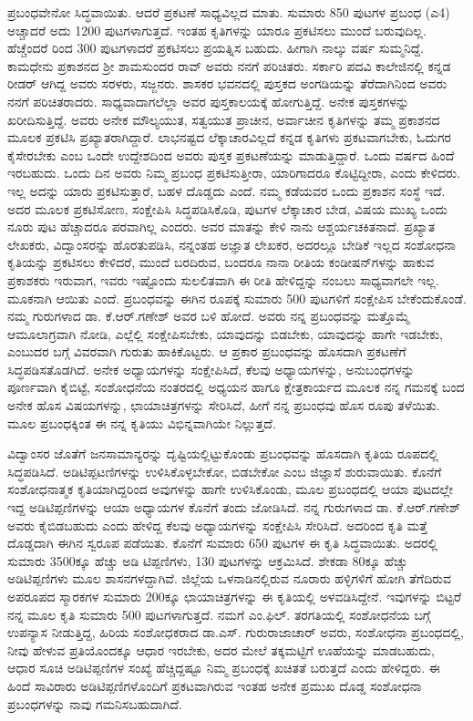 ಪ್ರಬಂಧವೇನೋ ಸಿದ್ಧವಾಯಿತು. ಆದರೆ ಪ್ರಕಟಣೆ ಸಾಧ್ಯವಿಲ್ಲದ ಮಾತು. ಸುಮಾರು 850 ಪುಟಗಳ ಪ್ರಬಂಧ (ಎ4) ಅಚ್ಚಾದರೆ ಅದು 1200 ಪುಟಗಳಾಗುತ್ತದೆ. ಇಂತಹ ಕೃತಿಗಳನ್ನು ಯಾರೂ ಪ್ರಕಟಿಸಲು ಮುಂದೆ ಬರುವುದಿಲ್ಲ. ಹೆಚ್ಚೆಂದರೆ ರಿಂದ 300 ಪುಟಗಳಾದರೆ ಪ್ರಕಟಿಸಲು ಪ್ರಯತ್ನಿಸ ಬಹುದು. ಹೀಗಾಗಿ ನಾಲ್ಕು ವರ್ಷ ಸುಮ್ಮನಿದ್ದೆ. ಕಾಮಧೇನು ಪ್ರಕಾಶನದ ಶ‍್ರೀ ಶಾಮಸುಂದರ ರಾವ್​ ಅವರು ನನಗೆ ಪರಿಚಿತರು. ಸರ್ಕಾರಿ ಪದವಿ ಕಾಲೇಜಿನಲ್ಲಿ ಕನ್ನಡ ರೀಡರ್​ ಆಗಿದ್ದ ಅವರು ಸರಳರು, ಸಜ್ಜನರು. ಶಾಸಕರ ಭವನದಲ್ಲಿ ಪುಸ್ತಕದ ಅಂಗಡಿಯನ್ನು ತೆರೆದಾಗಿನಿಂದ ಅವರು ನನಗೆ ಪರಿಚಿತರಾದರು. ಸಾಧ್ಯ\-ವಾದಾಗಲೆಲ್ಲಾ ಅವರ ಪುಸ್ತಕಾಲಯಕ್ಕೆ ಹೋಗುತ್ತಿದ್ದೆ. ಅನೇಕ ಪುಸ್ತಕಗಳನ್ನು ಖರೀದಿಸುತ್ತಿದ್ದೆ. ಅವರು ಅನೇಕ ಮೌಲ್ಯಯುತ, ಸತ್ವಯುತ ಪ್ರಾಚೀನ, ಅರ್ವಾಚೀನ ಕೃತಿಗಳನ್ನು ತಮ್ಮ ಪ್ರಕಾಶನದ ಮೂಲಕ ಪ್ರಕಟಿಸಿ ಪ್ರಖ್ಯಾತರಾಗಿದ್ದಾರೆ. ಲಾಭ\-ನಷ್ಟದ ಲೆಕ್ಕಾಚಾರವಿಲ್ಲದೆ ಕನ್ನಡ ಕೃತಿಗಳು ಪ್ರಕಟವಾಗಬೇಕು, ಓದುಗರ ಕೈಸೇರಬೇಕು ಎಂಬ ಒಂದೇ ಉದ್ದೇಶದಿಂದ ಅವರು ಪುಸ್ತಕ ಪ್ರಕಟಣೆಯನ್ನು ಮಾಡುತ್ತಿದ್ದಾರೆ. ಒಂದು ವರ್ಷದ ಹಿಂದೆ ಇರಬಹುದು. ಒಂದು ದಿನ ಅವರು ನಿಮ್ಮ ಪ್ರಬಂಧ ಪ್ರಕಟಿಸು\-ತ್ತೀರಾ, ಯಾರಿಗಾದರೂ ಕೊಟ್ಟಿದ್ದೀರಾ, ಎಂದು ಕೇಳಿದರು. ಇಲ್ಲ ಅದನ್ನು ಯಾರು ಪ್ರಕಟಿಸುತ್ತಾರೆ, ಬಹಳ ದೊಡ್ಡದು ಎಂದೆ. ನಮ್ಮ ಕಡೆಯವರ ಒಂದು ಪ್ರಕಾಶನ ಸಂಸ್ಥೆ ಇದೆ. ಅದರ ಮೂಲಕ ಪ್ರಕಟಿಸೋಣ, ಸಂಕ್ಷೇಪಿಸಿ ಸಿದ್ಧಪಡಿಸಿಕೊಡಿ, ಪುಟಗಳ ಲೆಕ್ಕಾಚಾರ ಬೇಡ, ವಿಷಯ ಮುಖ್ಯ ಒಂದು ನೂರು ಪುಟ ಹೆಚ್ಚಾದರೂ ಪರವಾಗಿಲ್ಲ ಎಂದರು. ಅವರ ಮಾತನ್ನು ಕೇಳಿ ನಾನು ಆಶ್ಚರ್ಯಚಕಿತನಾದೆ. ಪ್ರಖ್ಯಾತ ಲೇಖಕರು, ವಿದ್ವಾಂಸರನ್ನು ಹೊರತುಪಡಿಸಿ, ನನ್ನಂತಹ ಅಜ್ಞಾತ ಲೇಖಕರ, ಅದರಲ್ಲೂ ಬೇಡಿಕೆ ಇಲ್ಲದ ಸಂಶೋಧನಾ ಕೃತಿಯನ್ನು ಪ್ರಕಟಿಸಲು ಕೇಳಿದರೆ, ಮುಂದೆ ಬರದಿರುವ, ಬಂದರೂ ನಾನಾ ರೀತಿಯ ಕಂಡೀಷನ್​ಗಳನ್ನು ಹಾಕುವ ಪ್ರಕಾಶಕರು ಇರುವಾಗ, ಇವರು ಇಷ್ಟೊಂದು ಸುಲಲಿತವಾಗಿ ಈ ರೀತಿ ಹೇಳಿದ್ದನ್ನು ನಂಬಲು ಸಾಧ್ಯವಾಗಲೇ ಇಲ್ಲ. ಮೂಕನಾಗಿ ಆಯಿತು ಎಂದೆ. ಪ್ರಬಂಧವನ್ನು ಈಗಿನ ರೂಪಕ್ಕೆ ಸುಮಾರು 500 ಪುಟಗಳಿಗೆ ಸಂಕ್ಷೇಪಿಸ ಬೇಕೆಂದುಕೊಂಡೆ. ನಮ್ಮ ಗುರುಗಳಾದ ಡಾ. ಕೆ.ಆರ್​.ಗಣೇಶ್​ ಅವರ ಬಳಿ ಹೋದೆ. ಅವರು ನನ್ನ ಪ್ರಬಂಧವನ್ನು ಮತ್ತೊಮ್ಮೆ ಆಮೂಲಾಗ್ರವಾಗಿ ನೋಡಿ, ಎಲ್ಲೆಲ್ಲಿ ಸಂಕ್ಷೇಪಿಸಬೇಕು, ಯಾವುದನ್ನು ಬಿಡಬೇಕು, ಯಾವುದನ್ನು ಹಾಗೇ ಇಡಬೇಕು, ಎಂಬುದರ ಬಗ್ಗೆ ವಿವರವಾಗಿ ಗುರುತು ಹಾಕಿಕೊಟ್ಟರು. ಆ ಪ್ರಕಾರ ಪ್ರಬಂಧವನ್ನು ಹೊಸದಾಗಿ ಪ್ರಕಟಣೆಗೆ ಸಿದ್ಧಪಡಿಸತೊಡಗಿದೆ. ಅನೇಕ ಅಧ್ಯಾಯಗಳನ್ನು ಸಂಕ್ಷೇಪಿಸಿದೆ, ಕೆಲವು ಅಧ್ಯಾಯಗಳನ್ನು, ಅನುಬಂಧಗಳನ್ನು ಪೂರ್ಣವಾಗಿ ಕೈಬಿಟ್ಟೆ, ಸಂಶೋಧನೆಯ ನಂತರದಲ್ಲಿ ಅಧ್ಯಯನ ಹಾಗೂ ಕ್ಷೇತ್ರಕಾರ್ಯದ ಮೂಲಕ ನನ್ನ ಗಮನಕ್ಕೆ ಬಂದ ಅನೇಕ ಹೊಸ ವಿಷಯಗಳನ್ನು, ಛಾಯಾಚಿತ್ರಗಳನ್ನು ಸೇರಿಸಿದೆ, ಹೀಗೆ ನನ್ನ ಪ್ರಬಂಧವು ಹೊಸ ರೂಪು ತಳೆಯಿತು. ಮೂಲ ಪ್ರಬಂಧಕ್ಕಿಂತ ಈ ನನ್ನ ಕೃತಿಯು ವಿಭಿನ್ನವಾಗಿಯೇ ನಿಲ್ಲುತ್ತದೆ.

ವಿದ್ವಾಂಸರ ಜೊತೆಗೆ ಜನಸಾಮಾನ್ಯರನ್ನು ದೃಷ್ಟಿಯಲ್ಲಿಟ್ಟುಕೊಂಡು ಪ್ರಬಂಧವನ್ನು ಹೊಸದಾಗಿ ಕೃತಿಯ ರೂಪದಲ್ಲಿ ಸಿದ್ಧಪಡಿಸಿದೆ. ಅಡಿಟಿಪ್ಪಟಣಿಗಳನ್ನು ಉಳಿಸಿಕೊಳ್ಳಬೇಕೋ, ಬಿಡಬೇಕೋ ಎಂಬ ಜಿಜ್ಞಾಸೆ ಶುರುವಾಯಿತು. ಕೊನೆಗೆ ಸಂಶೋಧನಾತ್ಮಕ ಕೃತಿಯಾಗಿದ್ದರಿಂದ ಅವುಗಳನ್ನು ಹಾಗೇ ಉಳಿಸಿಕೊಂಡು, ಮೂಲ ಪ್ರಬಂಧದಲ್ಲಿ ಆಯಾ ಪುಟದಲ್ಲೇ ಇದ್ದ ಅಡಿಟಿಪ್ಪಣಿಗಳನ್ನು ಆಯಾ ಅಧ್ಯಾಯಗಳ ಕೊನೆಗೆ ತಂದು ಜೋಡಿಸಿದೆ. ನನ್ನ ಗುರುಗಳಾದ ಡಾ. ಕೆ.ಆರ್​.ಗಣೇಶ್​ ಅವರು ಕೈಬಿಡಬಹುದು ಎಂದು ಹೇಳಿದ್ದ ಕೆಲವು ಅಧ್ಯಾಯಗಳನ್ನು ಸಂಕ್ಷೇಪಿಸಿ ಸೇರಿಸಿದೆ. ಅದರಿಂದ ಕೃತಿ ಮತ್ತೆ ದೊಡ್ಡದಾಗಿ ಈಗಿನ ಸ್ವರೂಪ ಪಡೆಯಿತು. ಕೊನೆಗೆ ಸುಮಾರು 650 ಪುಟಗಳ ಈ ಕೃತಿ ಸಿದ್ಧವಾಯಿತು. ಅದರಲ್ಲಿ ಸುಮಾರು 3500ಕ್ಕೂ ಹೆಚ್ಚು ಅಡಿ ಟಿಪ್ಪಣಿಗಳು, 130 ಪುಟಗಳನ್ನು ಆಕ್ರಮಿಸಿದೆ. ಶೇಕಡಾ 80ಕ್ಕೂ ಹೆಚ್ಚು ಅಡಿಟಿಪ್ಪಣಿಗಳು ಮೂಲ ಶಾಸನಗಳದ್ದಾಗಿವೆ. ಜಿಲ್ಲೆಯ ಒಳನಾಡಿನಲ್ಲಿರುವ ನೂರಾರು ಹಳ್ಳಿಗಳಿಗೆ ಹೋಗಿ ತೆಗೆದಿರುವ ಅಪರೂಪದ ಸ್ಮಾರಕಗಳ ಸುಮಾರು 200ಕ್ಕೂ ಛಾಯಾಚಿತ್ರಗಳನ್ನು ಈ ಕೃತಿಯಲ್ಲಿ ಅಳವಡಿಸಿದ್ದೇನೆ. ಇವುಗಳನ್ನು ಬಿಟ್ಟರೆ ನನ್ನ ಮೂಲ ಕೃತಿ ಸುಮಾರು 500 ಪುಟಗಳಾಗುತ್ತದೆ. ನಮಗೆ ಎಂ.ಫಿಲ್​. ತರಗತಿಯಲ್ಲಿ ಸಂಶೋಧನೆಯ ಬಗ್ಗೆ ಉಪನ್ಯಾಸ ನೀಡುತ್ತಿದ್ದ, ಹಿರಿಯ ಸಂಶೋಧಕರಾದ ಡಾ.ಎಸ್​. ಗುರುರಾಜಾಚಾರ್​ ಅವರು, ಸಂಶೋಧನಾ ಪ್ರಬಂಧದಲ್ಲಿ, ನೀವು ಹೇಳುವ ಪ್ರತಿಯೊಂದಕ್ಕೂ ಆಧಾರ ಇರಬೇಕು, ಅದರ ಮೇಲೆ ತಕ್ಕಮಟ್ಟಿಗೆ ಊಹೆಯನ್ನು ಮಾಡಬಹುದು, ಆಧಾರ ಸೂಚಿ ಅಡಿಟಿಪ್ಪಣಿಗಳ ಸಂಖ್ಯೆ ಹೆಚ್ಚಿದ್ದಷ್ಟೂ ನಿಮ್ಮ ಪ್ರಬಂಧಕ್ಕೆ ಖಚಿತತೆ ಬರುತ್ತದೆ ಎಂದು ಹೇಳಿದ್ದರು. ಈ ಹಿಂದೆ ಸಾವಿರಾರು ಅಡಿಟಿಪ್ಪಣಿಗಳೊಂದಿಗೆ ಪ್ರಕಟವಾಗಿರುವ ಇಂತಹ ಅನೇಕ ಪ್ರಮುಖ ದೊಡ್ಡ ಸಂಶೋಧನಾ ಪ್ರಬಂಧಗಳನ್ನು ನಾವು ಗಮನಿಸಬಹುದಾಗಿದೆ.

